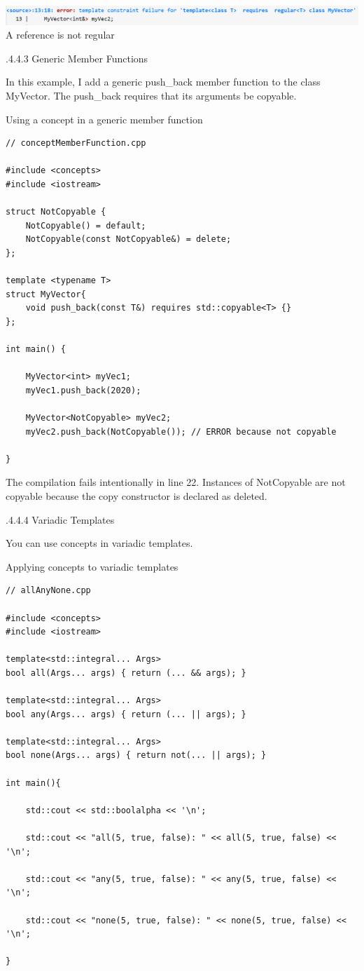\begin{center}
\includegraphics[width=1.0\textwidth]{content/3/chapter4/images/1-3.png}\\
A reference is not regular
\end{center}


.4.4.3\hspace{0.2cm} Generic Member Functions

In this example, I add a generic push\_back member function to the class MyVector. The push\_back requires that its arguments be copyable.

\noindent
Using a concept in a generic member function
\begin{lstlisting}[style=styleCXX]
// conceptMemberFunction.cpp

#include <concepts>
#include <iostream>

struct NotCopyable {
	NotCopyable() = default;
	NotCopyable(const NotCopyable&) = delete;
};

template <typename T>
struct MyVector{
	void push_back(const T&) requires std::copyable<T> {}
};

int main() {

	MyVector<int> myVec1;
	myVec1.push_back(2020);
	
	MyVector<NotCopyable> myVec2;
	myVec2.push_back(NotCopyable()); // ERROR because not copyable

}
\end{lstlisting}

The compilation fails intentionally in line 22. Instances of NotCopyable are not copyable because the copy constructor is declared as deleted.

.4.4.4\hspace{0.2cm} Variadic Templates

You can use concepts in variadic templates.

\noindent
Applying concepts to variadic templates
\begin{lstlisting}[style=styleCXX]
// allAnyNone.cpp

#include <concepts>
#include <iostream>

template<std::integral... Args>
bool all(Args... args) { return (... && args); }

template<std::integral... Args>
bool any(Args... args) { return (... || args); }

template<std::integral... Args>
bool none(Args... args) { return not(... || args); }

int main(){
	
	std::cout << std::boolalpha << '\n';
	
	std::cout << "all(5, true, false): " << all(5, true, false) << '\n';
	
	std::cout << "any(5, true, false): " << any(5, true, false) << '\n';
	
	std::cout << "none(5, true, false): " << none(5, true, false) << '\n';

}
\end{lstlisting}

